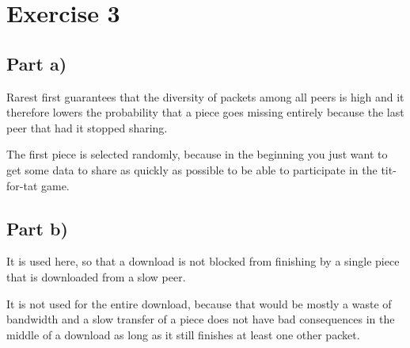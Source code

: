 \documentclass[10pt,a4paper]{article}
\begin{document}
\section*{Exercise 3}

\subsection*{Part a)}

Rarest first guarantees that the diversity of packets among all peers is high and it therefore lowers the probability that a piece goes missing entirely because the last peer that had it stopped sharing.

The first piece is selected randomly, because in the beginning you just want to get some data to share as quickly as possible to be able to participate in the tit-for-tat game.

\subsection*{Part b)}

It is used here, so that a download is not blocked from finishing by a single piece that is downloaded from a slow peer.

It is not used for the entire download, because that would be mostly a waste of bandwidth and a slow transfer of a piece does not have bad consequences in the middle of a download as long as it still finishes at least one other packet.
\end{document}
